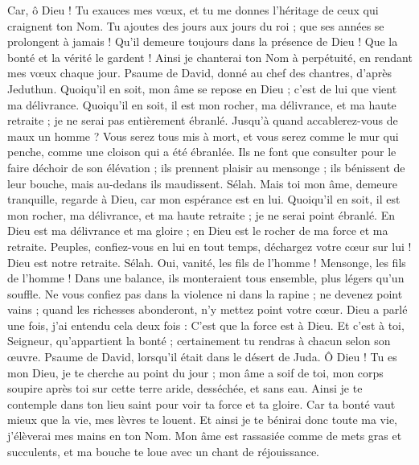 \begin{multicols}{2}
Car, ô Dieu ! Tu exauces mes vœux, et tu me donnes l'héritage de ceux qui craignent ton Nom.
Tu ajoutes des jours aux jours du roi ; que ses années se prolongent à jamais !
Qu'il demeure toujours dans la présence de Dieu ! Que la bonté et la vérité le gardent !
Ainsi je chanterai ton Nom à perpétuité, en rendant mes vœux chaque jour.
\VerseOne{}Psaume de David, donné au chef des chantres, d'après Jeduthun.
Quoiqu'il en soit, mon âme se repose en Dieu ; c'est de lui que vient ma délivrance.
Quoiqu'il en soit, il est mon rocher, ma délivrance, et ma haute retraite ; je ne serai pas entièrement ébranlé.
Jusqu'à quand accablerez-vous de maux un homme ? Vous serez tous mis à mort, et vous serez comme le mur qui penche, comme une cloison qui a été ébranlée.
Ils ne font que consulter pour le faire déchoir de son élévation ; ils prennent plaisir au mensonge ; ils bénissent de leur bouche, mais au-dedans ils maudissent. Sélah.
Mais toi mon âme, demeure tranquille, regarde à Dieu, car mon espérance est en lui.
Quoiqu'il en soit, il est mon rocher, ma délivrance, et ma haute retraite ; je ne serai point ébranlé.
En Dieu est ma délivrance et ma gloire ; en Dieu est le rocher de ma force et ma retraite.
Peuples, confiez-vous en lui en tout temps, déchargez votre cœur sur lui ! Dieu est notre retraite. Sélah.
Oui, vanité, les fils de l'homme ! Mensonge, les fils de l'homme ! Dans une balance, ils monteraient tous ensemble, plus légers qu'un souffle.
Ne vous confiez pas dans la violence ni dans la rapine ; ne devenez point vains ; quand les richesses abonderont, n'y mettez point votre cœur.
Dieu a parlé une fois, j'ai entendu cela deux fois : C'est que la force est à Dieu.
Et c'est à toi, Seigneur, qu'appartient la bonté ; certainement tu rendras à chacun selon son œuvre.
\VerseOne{}Psaume de David, lorsqu'il était dans le désert de Juda.
Ô Dieu ! Tu es mon Dieu, je te cherche au point du jour ; mon âme a soif de toi, mon corps soupire après toi sur cette terre aride, desséchée, et sans eau.
Ainsi je te contemple dans ton lieu saint pour voir ta force et ta gloire.
Car ta bonté vaut mieux que la vie, mes lèvres te louent.
Et ainsi je te bénirai donc toute ma vie, j'élèverai mes mains en ton Nom.
Mon âme est rassasiée comme de mets gras et succulents, et ma bouche te loue avec un chant de réjouissance.

\end{multicols}
